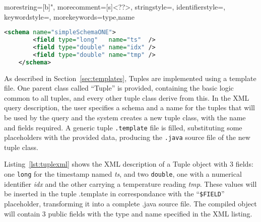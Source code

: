 	
	

{
  morestring=[b]",
  morecomment=[s]{<?}{?>},
  stringstyle=\color{BrickRed},
  identifierstyle=\color{NavyBlue},
  keywordstyle=\color{ForestGreen}, 
  morekeywords={type,name}%
}
\begin{lstlisting}[language=XML,label=lst:tuplexml,caption=XML description of a Tuple]
	<schema name="simpleSchemaONE">
	    <field type="long"   name="ts"  />
	    <field type="double" name="idx" />
	    <field type="double" name="tmp" />  
	</schema>
\end{lstlisting}


As described in Section~\ref{sec:templates}, Tuples are implemented using a template file. One parent
class called ``Tuple'' is provided, containing the basic logic common to all tuples, and every other
tuple class derive from this. In the XML query description, the user specifies a schema and a name for
the tuples that will be used by the query and the system creates a new tuple class, with the name and
fields required. A generic tuple \texttt{.template} file is filled, substituting some placeholders with
the provided data, producing the \texttt{.java} source file of the new tuple class.

Listing~\ref{lst:tuplexml} shows the XML description of a Tuple object with 3 fields: one \texttt{long}
for the timestamp named \textit{ts}, and two \texttt{double}, one with a numerical identifier \textit{idx}
and the other carrying a temperature reading \textit{tmp}. These values will be inserted in the tuple
.template in correspondance with the ``\texttt{\$FIELD}'' placeholder, transforming it into a complete
.java source file. The compiled object will contain 3 public fields with the type and name specified in
 the XML listing.
 
